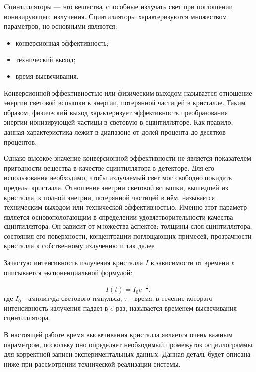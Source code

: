 Cцинтилляторы --- это вещества, способные излучать свет при поглощении ионизирующего излучения. Сцинтилляторы характеризуются множеством параметров, но основными являются:
\begin{itemize}
    \item конверсионная эффективность;
    \item технический выход;
    \item время высвечивания.
\end{itemize}\par
Конверсионной эффективностью или физическим выходом называется отношение энергии световой вспышки к энергии, потерянной частицей в кристалле. Таким образом, физический выход характеризует эффективность преобразования энергии ионизирующей частицы в световую в сцинтилляторе. Как правило, данная характеристика лежит в диапазоне от долей процента до десятков процентов.\par
Однако высокое значение конверсионной эффективности не является показателем пригодности вещества в качестве сцинтиллятора в детекторе. Для его использования необходимо, чтобы излучаемый свет мог свободно покидать пределы кристалла. Отношение энегрии световой вспышки, вышедшей из кристалла, к полной энегрии, потерянной частицей в нём, называется техническим выходом или технической эффективностью. Именно этот параметр является основопологающим в определении удовлетворительности качества сцинтиллятора. Он зависит от множества аспектов: толщины слоя сцинтиллятора, состояния его поверхности, концентрации поглощающих примесей, прозрачности кристалла к собственному излучению и так далее.\par
Зачастую интенсивность излучения кристалла $I$ в зависимости от времени $t$ описывается экспоненциальной формулой:\par
\begin{equation}
    I(t) = I_0 e^{-{\frac t {\tau}}},
\end{equation}
где $I_0$ - амплитуда светового импульса, $\tau$ - время, в течение которого интенсивность излучения падает в $e$ раз, называется временем высвечивания сцинтиллятора.\par
В настоящей работе время высвечивания кристалла является очень важным параметром, поскольку оно определяет необходимый промежуток осциллограммы для корректной записи экспериментальных данных. Данная деталь будет описана ниже при рассмотрении технической реализации системы.
